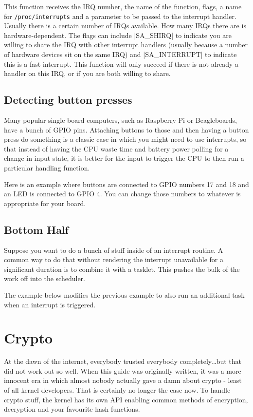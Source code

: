 \documentclass[10pt, oneside]{book}
\begin{document}
This function receives the IRQ number, the name of the function, flags, a name for \verb|/proc/interrupts| and a parameter to be passed to the interrupt handler.
Usually there is a certain number of IRQs available.
How many IRQs there are is hardware-dependent.
The flags can include \cpp|SA_SHIRQ| to indicate you are willing to share the IRQ with other interrupt handlers (usually because a number of hardware devices sit on the same IRQ) and \cpp|SA_INTERRUPT| to indicate this is a fast interrupt.
This function will only succeed if there is not already a handler on this IRQ, or if you are both willing to share.

\subsection{Detecting button presses}
\label{sec:detect_button}
Many popular single board computers, such as Raspberry Pi or Beagleboards, have a bunch of GPIO pins.
Attaching buttons to those and then having a button press do something is a classic case in which you might need to use interrupts,
so that instead of having the CPU waste time and battery power polling for a change in input state, it is better for the input to trigger the CPU to then run a particular handling function.

Here is an example where buttons are connected to GPIO numbers 17 and 18 and an LED is connected to GPIO 4.
You can change those numbers to whatever is appropriate for your board.


\subsection{Bottom Half}
\label{sec:bottom_half}
Suppose you want to do a bunch of stuff inside of an interrupt routine.
A common way to do that without rendering the interrupt unavailable for a significant duration is to combine it with a tasklet.
This pushes the bulk of the work off into the scheduler.

The example below modifies the previous example to also run an additional task when an interrupt is triggered.


\section{Crypto}
\label{sec:crypto}
At the dawn of the internet, everybody trusted everybody completely\ldots{}but that did not work out so well.
When this guide was originally written, it was a more innocent era in which almost nobody actually gave a damn about crypto - least of all kernel developers.
That is certainly no longer the case now.
To handle crypto stuff, the kernel has its own API enabling common methods of encryption, decryption and your favourite hash functions.
\end{document}
